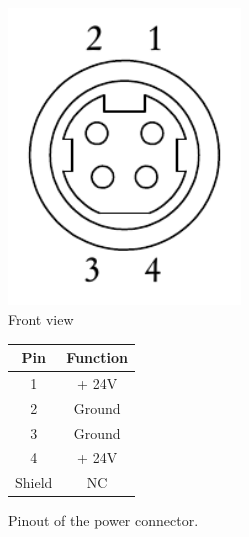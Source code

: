 \begin{figure}[h]
\begin{center}
\begin{minipage}[h]{0.49\textwidth}
    \centering
    \includegraphics[width=0.55\textwidth]{grafiken/R7B.pdf}\\
    Front view
  \end{minipage}
  \hfill
  \begin{minipage}[h]{0.49\textwidth}
    \centering
    \begin{tabular}{cc}
      \toprule
      \textbf{Pin} & \textbf{Function} \\
      \toprule
      1 & + 24V \\ \midrule
      2 & Ground\\ \midrule
      3 & Ground \\ \midrule
      4 & + 24V  \\ \midrule
      Shield & NC \\
      \bottomrule
    \end{tabular}
  \end{minipage}
\end{center}
\caption[Pinout of the power connector.]{Pinout of the power connector.}
\label{pin_out_power}
\end{figure}






\newpage
